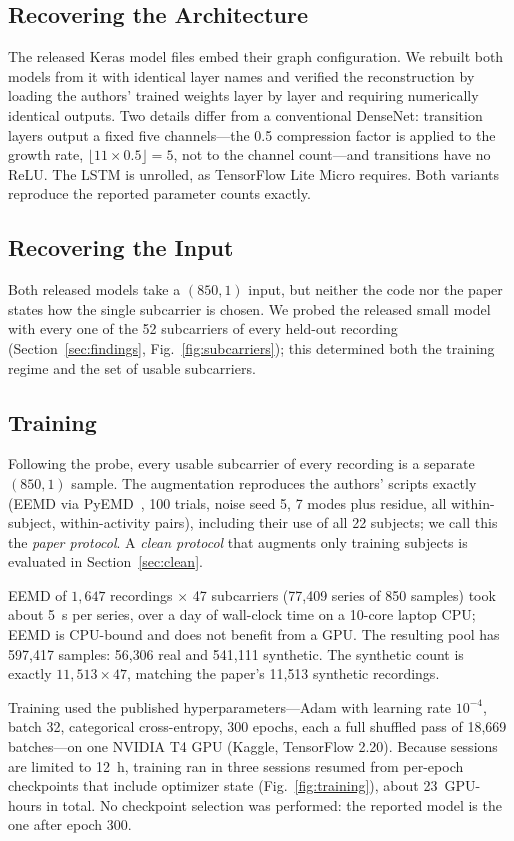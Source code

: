 \documentclass[journal]{IEEEtran}
\begin{document}
\subsection{Recovering the Architecture}
The released Keras model files embed their graph configuration. We rebuilt both
models from it with identical layer names and verified the reconstruction by loading
the authors' trained weights layer by layer and requiring numerically identical
outputs. Two details differ from a conventional DenseNet: transition layers output a
fixed five channels---the 0.5 compression factor is applied to the growth rate,
$\lfloor 11 \times 0.5 \rfloor = 5$, not to the channel count---and transitions have no
ReLU. The LSTM is unrolled, as TensorFlow Lite Micro requires. Both variants
reproduce the reported parameter counts exactly.

\subsection{Recovering the Input}
Both released models take a $(850, 1)$ input, but neither the code nor the paper
states how the single subcarrier is chosen. We probed the released small model with
every one of the 52 subcarriers of every held-out recording
(Section~\ref{sec:findings}, Fig.~\ref{fig:subcarriers}); this determined both the
training regime and the set of usable subcarriers.

\subsection{Training}
Following the probe, every usable subcarrier of every recording is a separate
$(850, 1)$ sample. The augmentation reproduces the authors' scripts exactly (EEMD via
PyEMD~\cite{laszuk2017pyemd}, 100 trials, noise seed 5, 7 modes plus residue, all within-subject, within-activity
pairs), including their use of all 22 subjects; we call this the \emph{paper
protocol}. A \emph{clean protocol} that augments only training subjects is
evaluated in Section~\ref{sec:clean}.

EEMD of $1{,}647$ recordings $\times$ 47 subcarriers (77{,}409 series of 850 samples)
took about 5~s per series, over a day of wall-clock time on a 10-core laptop CPU;
EEMD is CPU-bound and does not benefit from a GPU. The resulting pool has 597{,}417 samples: 56{,}306 real and 541{,}111 synthetic.
The synthetic count is exactly $11{,}513 \times 47$, matching the paper's
11{,}513 synthetic recordings.

Training used the published hyperparameters---Adam with learning rate $10^{-4}$,
batch 32, categorical cross-entropy, 300 epochs, each a full shuffled pass of
18{,}669 batches---on one NVIDIA T4 GPU (Kaggle, TensorFlow 2.20). Because sessions are
limited to 12~h, training ran in three sessions resumed from per-epoch checkpoints
that include optimizer state (Fig.~\ref{fig:training}), about 23~GPU-hours in total.
No checkpoint selection was performed: the reported model is the one after epoch
300.
\end{document}
